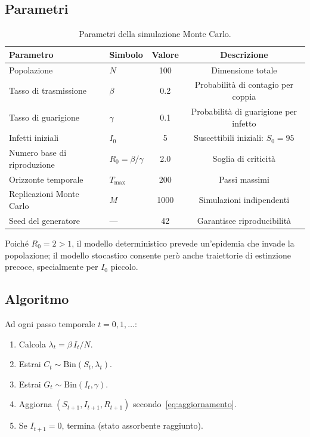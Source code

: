 \documentclass[11pt, a4paper]{article}
\theoremstyle{plain}
\theoremstyle{definition}
\theoremstyle{remark}
\begin{document}
\subsection{Parametri}

\begin{table}[H]
  \centering
  \caption{Parametri della simulazione Monte Carlo.}
  \label{tab:parametri}
  \begin{tabular}{@{}llcc@{}}
    \toprule
    Parametro & Simbolo & Valore & Descrizione \\
    \midrule
    Popolazione & $N$ & 100 & Dimensione totale \\
    Tasso di trasmissione & $\beta$ & 0.2 & Probabilità di contagio per coppia \\
    Tasso di guarigione & $\gamma$ & 0.1 & Probabilità di guarigione per infetto \\
    Infetti iniziali & $I_0$ & 5 & Suscettibili iniziali: $S_0 = 95$ \\
    Numero base di riproduzione & $R_0 = \beta/\gamma$ & 2.0 & Soglia di criticità \\
    Orizzonte temporale & $T_{\max}$ & 200 & Passi massimi \\
    Replicazioni Monte Carlo & $M$ & 1000 & Simulazioni indipendenti \\
    Seed del generatore & --- & 42 & Garantisce riproducibilità \\
    \bottomrule
  \end{tabular}
\end{table}

Poiché $R_0 = 2 > 1$, il modello deterministico prevede un'epidemia che invade la
popolazione; il modello stocastico consente però anche traiettorie di estinzione precoce,
specialmente per $I_0$ piccolo.

\subsection{Algoritmo}

Ad ogni passo temporale $t = 0, 1, \ldots$:

\begin{enumerate}[label=\arabic*.]
  \item Calcola $\lambda_t = \beta\, I_t / N$.
  \item Estrai $C_t \sim \mathrm{Bin}(S_t, \lambda_t)$.
  \item Estrai $G_t \sim \mathrm{Bin}(I_t, \gamma)$.
  \item Aggiorna $(S_{t+1}, I_{t+1}, R_{t+1})$ secondo~\eqref{eq:aggiornamento}.
  \item Se $I_{t+1} = 0$, termina (stato assorbente raggiunto).
\end{enumerate}
\end{document}
